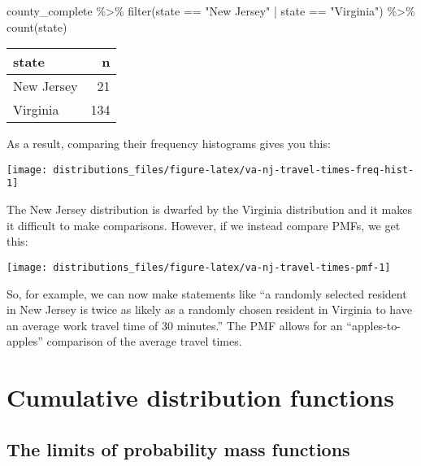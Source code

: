\documentclass[
]{book}
\newenvironment{Shaded}{\begin{snugshade}}{\end{snugshade}}
\newcommand{\FunctionTok}[1]{\textcolor[rgb]{0.00,0.00,0.00}{#1}}
\newcommand{\NormalTok}[1]{#1}
\newcommand{\SpecialCharTok}[1]{\textcolor[rgb]{0.00,0.00,0.00}{#1}}
\newcommand{\StringTok}[1]{\textcolor[rgb]{0.31,0.60,0.02}{#1}}
\begin{document}
\begin{Shaded}
\begin{Highlighting}[]
\NormalTok{county\_complete }\SpecialCharTok{\%\textgreater{}\%}
  \FunctionTok{filter}\NormalTok{(state }\SpecialCharTok{==} \StringTok{"New Jersey"} \SpecialCharTok{|}\NormalTok{ state }\SpecialCharTok{==} \StringTok{"Virginia"}\NormalTok{) }\SpecialCharTok{\%\textgreater{}\%}
  \FunctionTok{count}\NormalTok{(state)}
\end{Highlighting}
\end{Shaded}

\begin{table}
\centering
\begin{tabular}{l|r}
\hline
state & n\\
\hline
New Jersey & 21\\
\hline
Virginia & 134\\
\hline
\end{tabular}
\end{table}

As a result, comparing their frequency histograms gives you this:

\begin{center}\texttt{[image: distributions\_files/figure-latex/va-nj-travel-times-freq-hist-1]} \end{center}

The New Jersey distribution is dwarfed by the Virginia distribution and it makes it difficult to make comparisons.
However, if we instead compare PMFs, we get this:

\begin{center}\texttt{[image: distributions\_files/figure-latex/va-nj-travel-times-pmf-1]} \end{center}

So, for example, we can now make statements like ``a randomly selected resident in New Jersey is twice as likely as a randomly chosen resident in Virginia to have an average work travel time of 30 minutes.''
The PMF allows for an ``apples-to-apples'' comparison of the average travel times.

\hypertarget{cumulative-distribution-functions}{%
\section{Cumulative distribution functions}\label{cumulative-distribution-functions}}

\hypertarget{the-limits-of-probability-mass-functions}{%
\subsection{The limits of probability mass functions}\label{the-limits-of-probability-mass-functions}}
\end{document}
